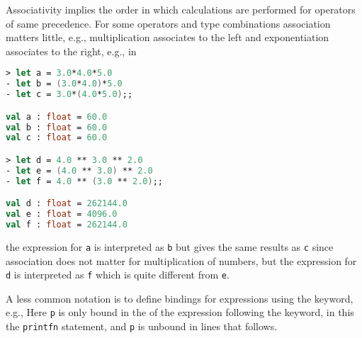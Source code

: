 Associativity implies the order in which calculations are performed for operators of same precedence. For some operators and type combinations association matters little, e.g., multiplication associates to the left and exponentiation associates to the right, e.g., in
%
\begin{lstlisting}[language=fsharp,caption={fsharpi, precedences rules define implicite parantheses.}]
> let a = 3.0*4.0*5.0
- let b = (3.0*4.0)*5.0
- let c = 3.0*(4.0*5.0);;

val a : float = 60.0
val b : float = 60.0
val c : float = 60.0

> let d = 4.0 ** 3.0 ** 2.0
- let e = (4.0 ** 3.0) ** 2.0
- let f = 4.0 ** (3.0 ** 2.0);;

val d : float = 262144.0
val e : float = 4096.0
val f : float = 262144.0
\end{lstlisting}
the expression for \lstinline|a| is interpreted as \lstinline|b| but gives the same results as \lstinline|c| since association does not matter for multiplication of numbers, but the expression for \lstinline|d| is interpreted as \lstinline|f| which is quite different from \lstinline|e|.

A less common notation is to define bindings for expressions using the  keyword, e.g.,
%
%
Here \lstinline|p| is only bound in the  of the expression following the  keyword, in this the \lstinline|printfn| statement, and \lstinline|p| is unbound in lines that follows.
\begin{comment}
  Here the use of indentation to define a sequence of expressions
  \fs{numbersInWIndentation}{The identifier \lstinline!p! is only bound in the nested scope following the keyword \keyword{in}.}
\end{comment}

